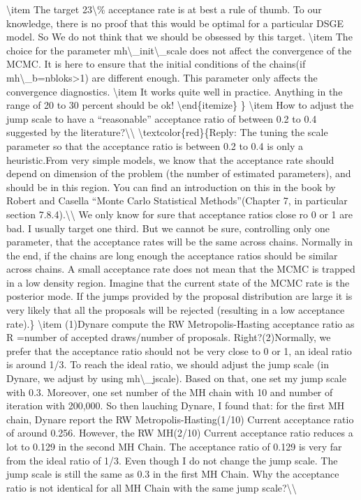 \documentclass[10pt,math=newtx,citestyle=gb7714-2015,bibstyle=gb7714-2015]{elegantbook}
\begin{document}
	\textbackslash{}item The target 23\textbackslash{}\% acceptance rate is at best a rule of thumb. To our knowledge, there is no proof that this would be optimal for a particular DSGE model. So We do not think that we should be obsessed by this target.
	\textbackslash{}item The choice for the parameter mh\textbackslash{}\_init\textbackslash{}\_scale does not affect the convergence of the MCMC. It is here to ensure that the initial conditions of the chains(if mh\textbackslash{}\_b=nbloks>1) are different enough. This parameter only affects the convergence diagnostics.
	\textbackslash{}item It works quite well in practice. Anything in the range of 20 to 30 percent should be ok!
	\textbackslash{}end\{itemize\}
	\}
	\textbackslash{}item How to adjust the jump scale to have a ``reasonable'' acceptance ratio of between 0.2 to 0.4 suggested by the literature?\textbackslash{}\textbackslash{}
	\textbackslash{}textcolor\{red\}\{Reply: The tuning the scale parameter so that the acceptance ratio is between 0.2 to 0.4 is only a heuristic.From very simple models, we know that the acceptance rate should depend on dimension of the problem (the number of estimated parameters), and should be in this region. You can find an introduction on this in the book by Robert and Casella ``Monte Carlo Statistical Methods''(Chapter 7, in particular section 7.8.4).\textbackslash{}\textbackslash{}
	We only know for sure that acceptance ratios close ro 0 or 1 are bad. I usually target one third. But we cannot be sure, controlling only one parameter, that the acceptance rates will be the same across chains. Normally in the end, if the chains are long enough the acceptance ratios should be similar across chains. A small acceptance rate does not mean that the MCMC is trapped in a low density region. Imagine that the current state of the MCMC rate is the posterior mode. If the jumps provided by the proposal distribution are large it is very likely that all the proposals will be rejected (resulting in a low acceptance rate).\}
	\textbackslash{}item (1)Dynare compute the RW Metropolis-Hasting acceptance ratio as R =number of accepted draws/number of proposals. Right?(2)Normally, we prefer that the acceptance ratio should not be very close to 0 or 1, an ideal ratio is around 1/3. To reach the ideal ratio, we should adjust the jump scale (in Dynare, we adjust by using mh\textbackslash{}\_jscale). Based on that, one set my jump scale with 0.3. Moreover, one set number of the MH chain with 10 and number of iteration with 200,000. So then lauching Dynare, I found that: for the first MH chain, Dynare report the RW Metropolis-Hasting(1/10) Current acceptance ratio of around 0.256. However, the RW MH(2/10) Current acceptance ratio reduces a lot to 0.129 in the second MH Chain. The acceptance ratio of 0.129 is very far from the ideal ratio of 1/3. Even though I do not change the jump scale. The jump scale is still the same as 0.3 in the first MH Chain. Why the acceptance ratio is not identical for all MH Chain with the same jump scale?\textbackslash{}\textbackslash{}
\end{document}
